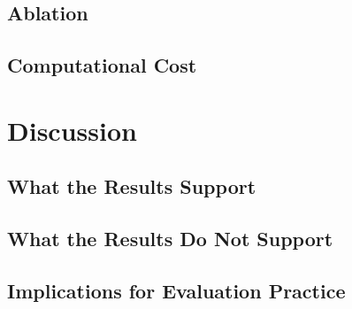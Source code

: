 \documentclass[lettersize,journal]{IEEEtran}
\begin{document}
\subsection{Ablation}
\label{sec:ablation}

\subsection{Computational Cost}
\label{sec:cost}

\section{Discussion}
\label{sec:discussion}

\subsection{What the Results Support}

\subsection{What the Results Do Not Support}

\subsection{Implications for Evaluation Practice}
\label{sec:checklist}
\end{document}
